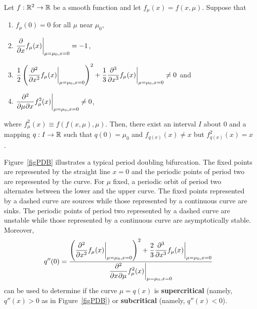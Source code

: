 \begin{theorem}
Let $f:\RR^2 \rightarrow \RR$ be a smooth function and let
$f_\mu(x)= f(x,\mu)$.  Suppose that
\begin{enumerate}
\item $f_{\mu}(0)=0$ for all $\mu$ near $\mu_0$,
\item $\displaystyle \pdfdx{f_{\mu}(x)}{x}\bigg|_{\mu=\mu_0,x=0} = -1$,
\item
$\displaystyle \frac{1}{2}
\left(\pdfdxn{f_{\mu}(x)}{x}{2}\bigg|_{\mu=\mu_0,x=0}\right)^2
+\frac{1}{3} \pdfdxn{f_{\mu}(x)}{x}{3}\bigg|_{\mu=\mu_0,x=0} \neq 0$
and
\item $\displaystyle \pdfdxnm{f_{\mu}^2(x)}{\mu}{x}{2}{}{}
\bigg|_{\mu=\mu_0,x=0} \not=0$,
\end{enumerate}
where $f^2_\mu(x) \equiv f(f(x,\mu),\mu)$.  Then, there exist
an interval $I$ about $0$ and a mapping $q:I\rightarrow \RR$ such that
$q(0) = \mu_0$ and $f_{q(x)}(x) \neq x$ but $f^2_{q(x)}(x) = x$.
\label{ThePDTforM}
\end{theorem}

Figure~\ref{figPDB} illustrates a typical period doubling bifurcation.
The fixed points are represented by the straight line $x=0$ and the periodic
points of period two are represented by the curve.   For $\mu$ fixed,
a periodic orbit of period two alternates between the lower and the
upper curve. The fixed points represented by a dashed curve are
sources while those represented by a continuous curve are sinks.   The
periodic points of period two represented by a dashed curve are
unstable while those represented by a continuous curve are
asymptotically stable.    Moreover,
\[
  q''(0) = \frac{\displaystyle
\left(\pdfdxn{f_{\mu}(x)}{x}{2}\bigg|_{\mu=\mu_0,x=0}\right)^2
+\frac{2}{3} \pdfdxn{f_{\mu}(x)}{x}{3}\bigg|_{\mu=\mu_0,x=0}}
{\displaystyle \pdfdxnm{f^2_{\mu}(x)}{x}{\mu}{2}{}{}\bigg|_{\mu=\mu_0,x=0}}
\]
can be used to determine if the curve $\mu=q(x)$ is
{\bfseries supercritical} (namely, $q''(x)>0$ as in
Figure~\ref{figPDB}) or {\bfseries subcritical}
(namely, $q''(x)<0$).


